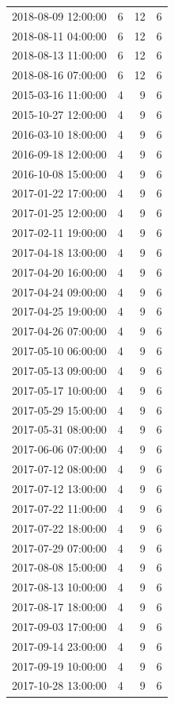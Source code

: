 \begin{tabular}{lrrr}
2018-08-09 12:00:00 & 6 & 12 & 6 \\
2018-08-11 04:00:00 & 6 & 12 & 6 \\
2018-08-13 11:00:00 & 6 & 12 & 6 \\
2018-08-16 07:00:00 & 6 & 12 & 6 \\
2015-03-16 11:00:00 & 4 & 9 & 6 \\
2015-10-27 12:00:00 & 4 & 9 & 6 \\
2016-03-10 18:00:00 & 4 & 9 & 6 \\
2016-09-18 12:00:00 & 4 & 9 & 6 \\
2016-10-08 15:00:00 & 4 & 9 & 6 \\
2017-01-22 17:00:00 & 4 & 9 & 6 \\
2017-01-25 12:00:00 & 4 & 9 & 6 \\
2017-02-11 19:00:00 & 4 & 9 & 6 \\
2017-04-18 13:00:00 & 4 & 9 & 6 \\
2017-04-20 16:00:00 & 4 & 9 & 6 \\
2017-04-24 09:00:00 & 4 & 9 & 6 \\
2017-04-25 19:00:00 & 4 & 9 & 6 \\
2017-04-26 07:00:00 & 4 & 9 & 6 \\
2017-05-10 06:00:00 & 4 & 9 & 6 \\
2017-05-13 09:00:00 & 4 & 9 & 6 \\
2017-05-17 10:00:00 & 4 & 9 & 6 \\
2017-05-29 15:00:00 & 4 & 9 & 6 \\
2017-05-31 08:00:00 & 4 & 9 & 6 \\
2017-06-06 07:00:00 & 4 & 9 & 6 \\
2017-07-12 08:00:00 & 4 & 9 & 6 \\
2017-07-12 13:00:00 & 4 & 9 & 6 \\
2017-07-22 11:00:00 & 4 & 9 & 6 \\
2017-07-22 18:00:00 & 4 & 9 & 6 \\
2017-07-29 07:00:00 & 4 & 9 & 6 \\
2017-08-08 15:00:00 & 4 & 9 & 6 \\
2017-08-13 10:00:00 & 4 & 9 & 6 \\
2017-08-17 18:00:00 & 4 & 9 & 6 \\
2017-09-03 17:00:00 & 4 & 9 & 6 \\
2017-09-14 23:00:00 & 4 & 9 & 6 \\
2017-09-19 10:00:00 & 4 & 9 & 6 \\
2017-10-28 13:00:00 & 4 & 9 & 6 \\

\end{tabular}
